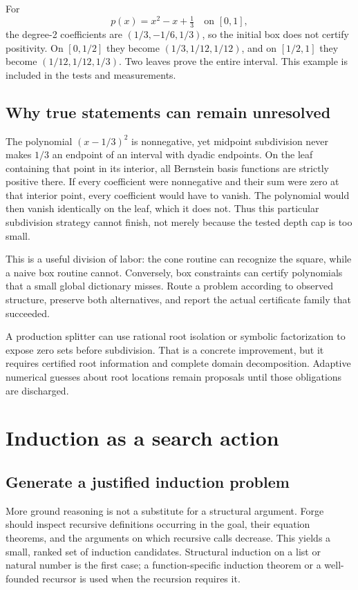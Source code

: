 \documentclass[11pt,a4paper]{article}
\begin{document}
For
\[
 p(x)=x^2-x+\tfrac13\quad\text{on }[0,1],
\]
the degree-2 coefficients are $(1/3,-1/6,1/3)$, so the initial box does not
certify positivity. On $[0,1/2]$ they become $(1/3,1/12,1/12)$, and on
$[1/2,1]$ they become $(1/12,1/12,1/3)$. Two leaves prove the entire interval.
This example is included in the tests and measurements.

\subsection{Why true statements can remain unresolved}

The polynomial $(x-1/3)^2$ is nonnegative, yet midpoint subdivision never makes
$1/3$ an endpoint of an interval with dyadic endpoints. On the leaf containing
that point in its interior, all Bernstein basis functions are strictly
positive there. If every coefficient were nonnegative and their sum were zero
at that interior point, every coefficient would have to vanish. The polynomial
would then vanish identically on the leaf, which it does not. Thus this
particular subdivision strategy cannot finish, not merely because the tested
depth cap is too small.

This is a useful division of labor: the cone routine can recognize the square,
while a naive box routine cannot. Conversely, box constraints can certify
polynomials that a small global dictionary misses. Route a problem according
to observed structure, preserve both alternatives, and report the actual
certificate family that succeeded.

A production splitter can use rational root isolation or symbolic factorization
to expose zero sets before subdivision. That is a concrete improvement, but
it requires certified root information and complete domain decomposition.
Adaptive numerical guesses about root locations remain proposals until those
obligations are discharged.


\section{Induction as a search action}

\subsection{Generate a justified induction problem}

More ground reasoning is not a substitute for a structural argument. Forge
should inspect recursive definitions occurring in the goal, their equation
theorems, and the arguments on which recursive calls decrease. This yields a
small, ranked set of induction candidates. Structural induction on a list or
natural number is the first case; a function-specific induction theorem or a
well-founded recursor is used when the recursion requires it.
\end{document}
